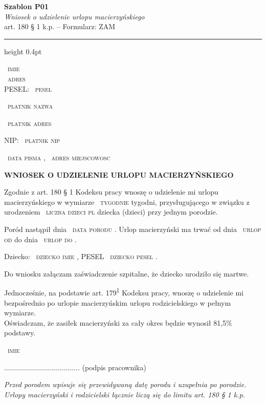 \documentclass[11pt,a4paper]{article}
\newcommand{\Pole}[1]{%
  \textcolor{szary}{\dotfill}\,%
  {\scriptsize\textcolor{szary}{\textsc{#1}}}%
}
\newenvironment{warunek}[1]{%
  \par\smallskip\noindent\begin{minipage}{\linewidth}%
  \color{black}%
}{%
  \end{minipage}\par\smallskip%
}
\newcommand{\NaglowekPisma}[1]{%
  \par\vspace{0.8em}%
  \begin{center}%
    {\large\bfseries\MakeUppercase{#1}}%
  \end{center}%
  \vspace{0.4em}%
}
\begin{document}
\begin{flushright}
{\footnotesize\color{szary}
\textbf{Szablon P01}\\
{\itshape Wniosek o udzielenie urlopu macierzyńskiego}\\
art. 180 \S{} 1 k.p. -- Formularz: ZAM}\
\end{flushright}

\vspace{0.5em}
{\color{ramka}\hrule height 0.4pt}
\vspace{0.8em}

\Pole{imie}\\[-2pt]
\Pole{adres}\\[-2pt]
PESEL: \Pole{pesel}

\Pole{platnik nazwa}
\Pole{platnik adres}
NIP: \Pole{platnik nip}

\Pole{data pisma}, \Pole{adres miejscowosc}

\NaglowekPisma{WNIOSEK O UDZIELENIE URLOPU MACIERZYŃSKIEGO}

Zgodnie z art. 180 \S{} 1 Kodeksu pracy wnoszę o udzielenie mi urlopu
macierzyńskiego w wymiarze \Pole{tygodnie} tygodni, przysługującego w związku
z urodzeniem \Pole{liczba dzieci pl} dziecka (dzieci) przy jednym porodzie.

Poród nastąpił dnia \Pole{data porodu}.
Urlop macierzyński ma trwać od dnia \Pole{urlop od} do dnia \Pole{urlop do}.

\begin{warunek}{jesli_dziecko}
Dziecko: \Pole{dziecko imie}, PESEL \Pole{dziecko pesel}.
\end{warunek}

\begin{warunek}{jesli_martwe}
Do wniosku załączam zaświadczenie szpitalne, że dziecko urodziło się martwe.
\end{warunek}

\begin{warunek}{jesli_pelny_wymiar}
Jednocześnie, na podstawie art. 179\textsuperscript{1} Kodeksu pracy, wnoszę o udzielenie mi\\[-2pt]
bezpośrednio po urlopie macierzyńskim urlopu rodzicielskiego w pełnym wymiarze.\\[-2pt]
Oświadczam, że zasiłek macierzyński za cały okres będzie wynosił 81,5\% podstawy.
\end{warunek}

\Pole{imie}
......................................
(podpis pracownika)

\vfill
{\footnotesize\textcolor{szary}\itshape Przed porodem wpisuje się przewidywaną datę porodu i uzupełnia po porodzie. Urlopy macierzyński i rodzicielski łącznie liczą się do limitu art. 180 \S{} 1 k.p. }
\end{document}

